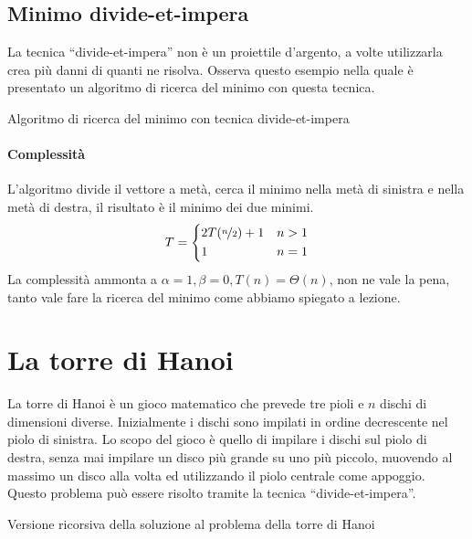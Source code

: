 \subsection*{Minimo divide-et-impera}

La tecnica \enquote{divide-et-impera} non è un proiettile d'argento, a volte utilizzarla crea più danni di quanti ne risolva.
Osserva questo esempio nella quale è presentato un algoritmo di ricerca del minimo con questa tecnica.
\begin{algorithm}[H]
\caption{Algoritmo di ricerca del minimo con tecnica divide-et-impera}
\end{algorithm}

\paragraph{Complessità}
L'algoritmo divide il vettore a metà, cerca il minimo nella metà di sinistra e nella metà di destra, il risultato è il minimo dei due minimi.
\begin{align*}
	T &=
	\begin{dcases}
		2T(\nicefrac{n}{2}) + 1 & n > 1\\
		1 & n = 1 \\
	\end{dcases}\\
\end{align*}
La complessità ammonta a \(\alpha=1, \beta=0, T(n) = \Theta(n)\), non ne vale la pena, tanto vale fare la ricerca del minimo come abbiamo spiegato a lezione.

\section{La torre di Hanoi}

La torre di Hanoi è un gioco matematico che prevede tre pioli e \(n\) dischi di dimensioni diverse.
Inizialmente i dischi sono impilati in ordine decrescente nel piolo di sinistra.
Lo scopo del gioco è quello di impilare i dischi sul piolo di destra, senza mai impilare un disco più grande su uno più piccolo, muovendo al massimo un disco alla volta ed utilizzando il piolo centrale come appoggio.
Questo problema può essere risolto tramite la tecnica \enquote{divide-et-impera}.

\begin{algorithm}[H]
	\caption{Versione ricorsiva della soluzione al problema della torre di Hanoi}
	
\end{algorithm}

